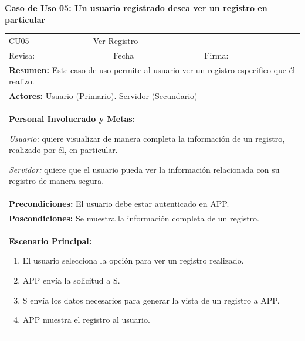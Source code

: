 		\textbf{Caso de Uso 05: Un usuario registrado desea ver un registro en particular}
			\begin{longtable}{|l|p{5.5cm}|l|p{2cm}|l|p{1.9cm}|} \hline
				\cellcolor{grisOscuro} CU05 & \multicolumn{4}{|l|}{  \cellcolor{grisOscuro} Ver Registro} &  \cellcolor{grisClaro}\multirow{2}{1cm}{} \\ \cline{1-5}
				\cellcolor{grisOscuro} Revisa: &  \cellcolor{grisClaro} &  \cellcolor{grisOscuro} Fecha &  \cellcolor{grisClaro} &  \cellcolor{grisOscuro} Firma: & \cellcolor{grisClaro} \\ \hline
				\multicolumn{6}{|p{15cm}|}{ \textbf{Resumen: } Este caso de uso permite al usuario ver un registro especifico que él realizo.

				} \\ \hline

				\multicolumn{6}{|p{15cm}|}{ \textbf{Actores: } Usuario (Primario). Servidor (Secundario)

				} \\ \hline

				\multicolumn{6}{|p{15cm}|}{ \textbf{Personal Involucrado y Metas: }
				
				\emph{Usuario:} quiere visualizar de manera completa la información de un registro, realizado por él, en particular.

				\emph{Servidor:} quiere que el usuario pueda ver la información relacionada con su registro de manera segura.

				} \\ \hline

				\multicolumn{6}{|p{15cm}|}{ \textbf{Precondiciones: } El usuario debe estar autenticado en APP.

				} \\ \hline

				\multicolumn{6}{|p{15cm}|}{ \textbf{Poscondiciones: } Se muestra la información completa de un registro.

				} \\ \hline

				\multicolumn{6}{|p{15cm}|}{ \textbf{Escenario Principal: }

				\begin{enumerate}
					\item El usuario selecciona la opción para ver un registro realizado.
					\item APP envía la solicitud a S.
					\item S envía los datos necesarios para generar la vista de un registro a APP.
					\item APP muestra el registro al usuario.
				\end{enumerate}

}
\end{longtable}
